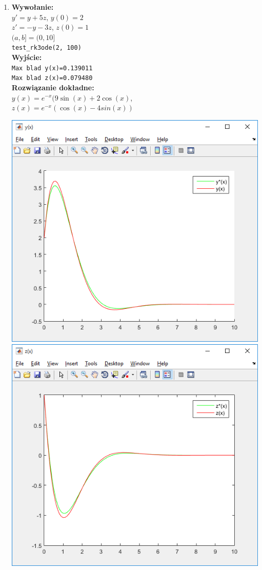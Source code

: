 \documentclass[]{article}
\begin{document}
\begin{enumerate}
\item \textbf{Wywołanie:}\\
$y'=y+5z$,\hspace{8mm}      $y(0)=2$\\
$z'=-y-3z$,\hspace{5mm}   $z(0)=1$\\
$(a,b] = (0,10]$
\\
\verb|test_rk3ode(2, 100)|
\\\textbf{Wyjście:}\\
\verb|Max blad y(x)=0.139011|\\
\verb|Max blad z(x)=0.079480|\\
\textbf{Rozwiązanie dokładne:}\\ $y(x)= e^{-x}(9\sin (x)+2\cos (x)$,\\ $z(x)= e^{-x}(\cos(x)-4sin(x))$
\begin{center}
	\includegraphics[scale=0.7]{y2.png}\\
	\includegraphics[scale=0.7]{z2.png}

\end{center}
\end{enumerate}
\end{document}

